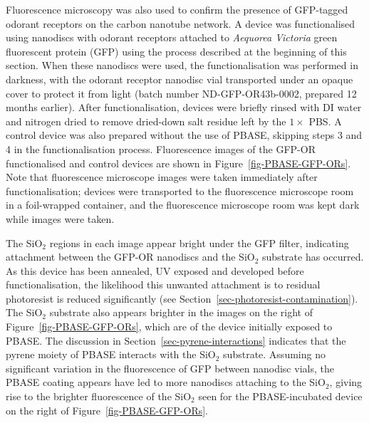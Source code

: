 \documentclass[
  a4paper,
]{scrbook}
\begin{document}
Fluorescence microscopy was also used to confirm the presence of
GFP-tagged odorant receptors on the carbon nanotube network. A device
was functionalised using nanodiscs with odorant receptors attached to
\emph{Aequorea Victoria} green fluorescent protein (GFP) using the
process described at the beginning of this section. When these nanodiscs
were used, the functionalisation was performed in darkness, with the
odorant receptor nanodisc vial transported under an opaque cover to
protect it from light (batch number ND-GFP-OR43b-0002, prepared 12
months earlier). After functionalisation, devices were briefly rinsed
with DI water and nitrogen dried to remove dried-down salt residue left
by the \(1 \times\) PBS. A control device was also prepared without the
use of PBASE, skipping steps 3 and 4 in the functionalisation process.
Fluorescence images of the GFP-OR functionalised and control devices are
shown in Figure~\ref{fig-PBASE-GFP-ORs}. Note that fluorescence
microscope images were taken immediately after functionalisation;
devices were transported to the fluorescence microscope room in a
foil-wrapped container, and the fluorescence microscope room was kept
dark while images were taken.

The SiO\(_2\) regions in each image appear bright under the GFP filter,
indicating attachment between the GFP-OR nanodiscs and the SiO\(_2\)
substrate has occurred. As this device has been annealed, UV exposed and
developed before functionalisation, the likelihood this unwanted
attachment is to residual photoresist is reduced significantly (see
Section~\ref{sec-photoresist-contamination}). The SiO\(_2\) substrate
also appears brighter in the images on the right of
Figure~\ref{fig-PBASE-GFP-ORs}, which are of the device initially
exposed to PBASE. The discussion in
Section~\ref{sec-pyrene-interactions} indicates that the pyrene moiety
of PBASE interacts with the SiO\(_2\) substrate. Assuming no significant
variation in the fluorescence of GFP between nanodisc vials, the PBASE
coating appears have led to more nanodiscs attaching to the SiO\(_2\),
giving rise to the brighter fluorescence of the SiO\(_2\) seen for the
PBASE-incubated device on the right of Figure~\ref{fig-PBASE-GFP-ORs}.
\end{document}
